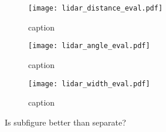 \begin{figure}[htb]
	\centering
	\begin{subfigure}{1\textwidth}
		\centering
		\texttt{[image: lidar\_distance\_eval.pdf]}
		\caption{caption}
		\label{fig:lidar_distance_evalTest}
	\end{subfigure}
	
	\begin{subfigure}{1\textwidth}
		\centering
		\texttt{[image: lidar\_angle\_eval.pdf]}
		\caption{caption}
		\label{fig:lidar_angle_evalTest}
	\end{subfigure}
	
	\begin{subfigure}{1\textwidth}
		\centering
		\texttt{[image: lidar\_width\_eval.pdf]}
		\caption{caption}
		\label{fig:lidar_width_evalTest}
	\end{subfigure}
	\caption{Is subfigure better than separate?}
	\label{fig:subFigTest}
\end{figure}
